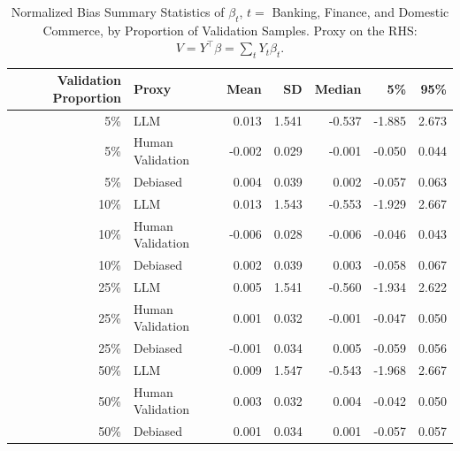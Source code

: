 \begin{table}

\caption{\label{tab:unnamed-chunk-1}Normalized Bias Summary Statistics of $\beta_{t}$, $t=$ Banking, Finance, and Domestic Commerce, by Proportion of Validation Samples.
      Proxy on the RHS: $V = Y^\top \beta = \sum_{t} Y_t \beta_t$.}
\centering
\begin{tabular}[t]{rlrrrrr}
\toprule
Validation Proportion & Proxy & Mean & SD & Median & 5\% & 95\%\\
\midrule
5\% & LLM & 0.013 & 1.541 & -0.537 & -1.885 & 2.673\\
5\% & Human Validation & -0.002 & 0.029 & -0.001 & -0.050 & 0.044\\
5\% & Debiased & 0.004 & 0.039 & 0.002 & -0.057 & 0.063\\
10\% & LLM & 0.013 & 1.543 & -0.553 & -1.929 & 2.667\\
10\% & Human Validation & -0.006 & 0.028 & -0.006 & -0.046 & 0.043\\
10\% & Debiased & 0.002 & 0.039 & 0.003 & -0.058 & 0.067\\
25\% & LLM & 0.005 & 1.541 & -0.560 & -1.934 & 2.622\\
25\% & Human Validation & 0.001 & 0.032 & -0.001 & -0.047 & 0.050\\
25\% & Debiased & -0.001 & 0.034 & 0.005 & -0.059 & 0.056\\
50\% & LLM & 0.009 & 1.547 & -0.543 & -1.968 & 2.667\\
50\% & Human Validation & 0.003 & 0.032 & 0.004 & -0.042 & 0.050\\
50\% & Debiased & 0.001 & 0.034 & 0.001 & -0.057 & 0.057\\
\bottomrule
\end{tabular}
\end{table}

